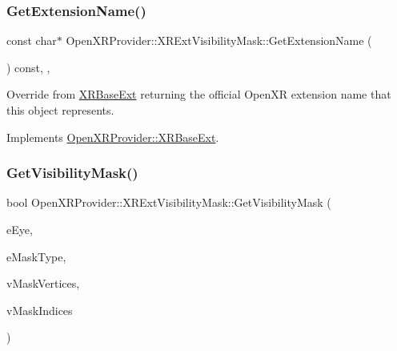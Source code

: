 \subsubsection{\texorpdfstring{GetExtensionName()}{GetExtensionName()}}
{\footnotesize\ttfamily const char$\ast$ Open\+X\+R\+Provider\+::\+X\+R\+Ext\+Visibility\+Mask\+::\+Get\+Extension\+Name (\begin{DoxyParamCaption}{ }\end{DoxyParamCaption}) const\hspace{0.3cm}{\ttfamily [inline]}, {\ttfamily [override]}, {\ttfamily [virtual]}}



Override from \mbox{\hyperlink{class_open_x_r_provider_1_1_x_r_base_ext}{X\+R\+Base\+Ext}} returning the official Open\+XR extension name that this object represents. 



Implements \mbox{\hyperlink{class_open_x_r_provider_1_1_x_r_base_ext_af23385b0dc226b0c4533a796ddc37352}{Open\+X\+R\+Provider\+::\+X\+R\+Base\+Ext}}.

\mbox{\label{class_open_x_r_provider_1_1_x_r_ext_visibility_mask_abba0f5bc2a79600d137ee98941865947}} 
\subsubsection{\texorpdfstring{GetVisibilityMask()}{GetVisibilityMask()}}
{\footnotesize\ttfamily bool Open\+X\+R\+Provider\+::\+X\+R\+Ext\+Visibility\+Mask\+::\+Get\+Visibility\+Mask (\begin{DoxyParamCaption}\item[{\mbox{\hyperlink{namespace_open_x_r_provider_a8aa379869e30772896e6c468eb54f155}{E\+X\+R\+Eye}}}]{e\+Eye,  }\item[{\mbox{\hyperlink{class_open_x_r_provider_1_1_x_r_ext_visibility_mask_a80c9de64fb067663f183e0b36a819b41}{E\+Mask\+Type}}}]{e\+Mask\+Type,  }\item[{std\+::vector$<$ float $>$ \&}]{v\+Mask\+Vertices,  }\item[{std\+::vector$<$ uint32\+\_\+t $>$ \&}]{v\+Mask\+Indices }\end{DoxyParamCaption})}

